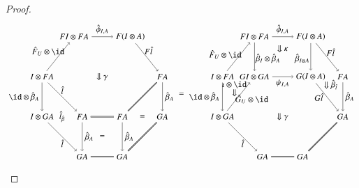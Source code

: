 \documentclass{amsart}
\begin{document}
\begin{proof}
\begin{equation}
\begin{aligned}
\begin{tikzpicture}[scale=1.7]
\node (llb) at (0,1) {$I \otimes GA$};
\node (llt) at (0,2) {$I \otimes FA$};
\node (bbl) at (1,0) {$GA$};
\node (bml)at (1,1) {$FA$};
\node (tl) at (0.8,3) {$FI \otimes FA$};
\node (bbr) at (2,0) {$GA$};
\node (bmr) at (2,1) {$FA$};
\node (tr) at (2.2,3) {$F(I \otimes A)$};
\node (brr) at (3,1) {$GA$};
\node (trr) at (3,2) {$FA$};
\draw[->] (llb) to node [below]{$\hat{l}$} (bbl);
\draw[->] (llt) to node [left]{$\id \otimes \hat{\beta}_A$} (llb);
\draw[->] (llt) to node [above,xshift=-12,yshift=-2]{${\hat{F}_U} \otimes \id$} (tl);
\draw[->] (llt) to node [above]{$\hat{l}$} (bml);
\draw[->] (tl) to node [above]{$\hat{\phi}_{I,A}$} (tr);
\draw[double] (bml) to (bmr);
\draw[double] (bbl) to (bbr);
\draw[double] (bbr) to (brr);
\draw[->] (tr) to node [above,xshift=2]{$F\hat{l}$} (trr);
\draw[double] (bmr) to (trr);
\draw[->] (trr) to node [right]{$\hat{\beta}_A$} (brr);
\draw[->] (bml) to node [right]{$\hat{\beta}_A$} (bbl);
\draw[->] (bmr) to node [right]{$\hat{\beta}_A$} (bbr);
\node at (1.5, 2) {$\Downarrow \gamma$};
\node at (0.5, 1) {$\hat{l}_{\hat{\beta}}$};
\node at (1.5, 0.5) {$=$};
\node at (2.5, 1) {$=$};
\end{tikzpicture}
\end{aligned}
=
\begin{aligned}
\begin{tikzpicture}[scale=1.7]
\node (llb) at (0,1) {$I \otimes GA$};
\node (llt) at (0,2) {$I \otimes FA$};
\node (bbl) at (1,0) {$GA$};
\node (bml) at (0.8,2) {$GI \otimes GA$};
\node (tl) at (0.8,3) {$FI \otimes FA$};
\node (bbr) at (2,0) {$GA$};
\node (bmr) at (2.2,2) {$G(I \otimes A)$};
\node (tr) at (2.2,3) {$F(I \otimes A)$};
\node (brr) at (3,1) {$GA$};
\node (trr) at (3,2) {$FA$};
\draw[->] (llb) to node [below]{$\hat{l}$} (bbl);
\draw[->] (llt) to node [left]{$\id \otimes \hat{\beta}_A$} (llb);
\draw[->] (llt) to node [above,xshift=-16pt,yshift=-6pt]{${\hat{F}_U} \otimes \id$} (tl);
\draw[->] (llb) to node [below, xshift=16,yshift=6]{$ \hat{G}_U \otimes \id$} (bml);
\draw[->] (tl) to node [above]{$\hat{\phi}_{I,A}$} (tr);
\draw[->] (bml) to node [below] {$\psi_{I,A}$} (bmr);
\draw[double] (bbl) to (bbr);
\draw[double] (bbr) to (brr);
\draw[->] (tr) to node [above,xshift=4, yshift=-2]{$F\hat{l}$} (trr);
\draw[->] (bmr) to node [below,xshift=-10,yshift=8] {$G \hat{l}$} (brr);
\draw[->] (trr) to node [right]{$\hat{\beta}_A$} (brr);
\draw[->] (tl) to node [right,xshift=-2,yshift=-2]{$\hat{\beta}_I \otimes \hat{\beta}_A$} (bml);
\draw[->] (tr) to node [left,xshift=2,yshift=-2]{$\hat{\beta}_{I \otimes A}$} (bmr);
\node at (1.5, 2.7) {$\Downarrow \kappa$};
\node at (0.3, 1.6) {$\Downarrow$};
\node at (0.3, 1.8) {$\iota \otimes \id$};
\node at (2.7,1.8) {$\Downarrow \hat{\beta}_{\hat{l}}$};
\node at (1.5, 1) {$\Downarrow \gamma$};
\end{tikzpicture}
\end{aligned}
\end{equation}


\end{proof}
\end{document}
